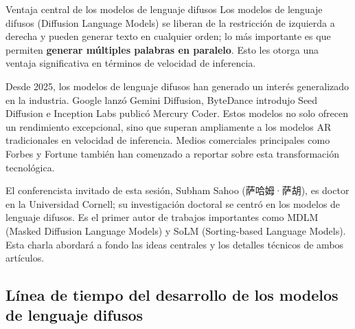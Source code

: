 \documentclass[a4paper]{article}
\begin{document}
\begin{importantbox}{Ventaja central de los modelos de lenguaje difusos}
Los modelos de lenguaje difusos (Diffusion Language Models) se liberan de la restricción de izquierda a derecha y pueden generar texto en cualquier orden; lo más importante es que permiten \textbf{generar múltiples palabras en paralelo}. Esto les otorga una ventaja significativa en términos de velocidad de inferencia.
\end{importantbox}

Desde 2025, los modelos de lenguaje difusos han generado un interés generalizado en la industria. Google lanzó Gemini Diffusion, ByteDance introdujo Seed Diffusion e Inception Labs publicó Mercury Coder. Estos modelos no solo ofrecen un rendimiento excepcional, sino que superan ampliamente a los modelos AR tradicionales en velocidad de inferencia. Medios comerciales principales como Forbes y Fortune también han comenzado a reportar sobre esta transformación tecnológica.

El conferencista invitado de esta sesión, Subham Sahoo (萨哈姆·萨胡), es doctor en la Universidad Cornell; su investigación doctoral se centró en los modelos de lenguaje difusos. Es el primer autor de trabajos importantes como MDLM (Masked Diffusion Language Models) y SoLM (Sorting-based Language Models). Esta charla abordará a fondo las ideas centrales y los detalles técnicos de ambos artículos.

\subsection{Línea de tiempo del desarrollo de los modelos de lenguaje difusos}
\end{document}
